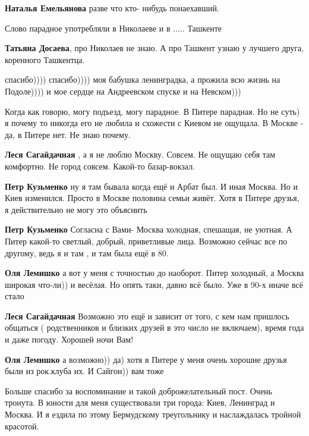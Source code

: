 \begin{itemize}
\begin{itemize}
\textbf{Наталья Емельянова} разве что кто- нибудь понаехавший.

Слово парадное употребляли в Николаеве и в ..... Ташкенте

\textbf{Татьяна Досаева}, про Николаев не знаю. А про Ташкент узнаю у лучшего друга, коренного Ташкентца.
\end{itemize} %

спасибо)))) спасибо)))) моя бабушка ленинградка, а прожила всю жизнь на Подоле)))) и мое сердце на Андреевском спуске и на Невском)))


Когда как говорю, могу подъезд, могу парадное. В Питере парадная. Но не суть) я
почему то никогда его не любила и схожести с Киевом не ощущала. В Москве - да,
в Питере нет. Не знаю почему.

\begin{itemize} %
\textbf{Леся Сагайдачная} , а я не люблю Москву. Совсем. Не ощущаю себя там комфортно. Не город совсем. Какой-то базар-вокзал.

\textbf{Петр Кузьменко} ну я там бывала когда ещё и Арбат был. И иная Москва. Но и Киев изменился. Просто в Москве половина семьи живёт. Хотя в Питере друзья, я действительно не могу это объяснить

\textbf{Петр Кузьменко} Согласна с Вами- Москва холодная, спешащая, не уютная. А Питер какой-то светлый, добрый, приветливые лица. Возможно сейчас все по другому, ведь я и там , и там была ещё в 80.

\textbf{Оля Лемишко} а вот у меня с точностью до наоборот. Питер холодный, а Москва широкая что-ли)) и весёлая. Но опять таки, давно всё было. Уже в 90-х иначе всё стало

\textbf{Леся Сагайдачная} Возможно это ещё и зависит от того, с кем нам пришлось общаться ( родственников и близких друзей в это число не включаем), время года и даже погоду. Хорошей ночи Вам!

\textbf{Оля Лемишко} а возможно)) да) хотя в Питере у меня очень хорошие друзья были из рок.клуба их. И Сайгон)) вам тоже
\end{itemize} %


Больше спасибо за воспоминание и такой доброжелательный пост. Очень тронута. В
юности для меня существовали три города: Киев, Ленинград и Москва. И я ездила
по этому Бермудскому треугольнику и наслаждалась тройной красотой.


\end{itemize}
